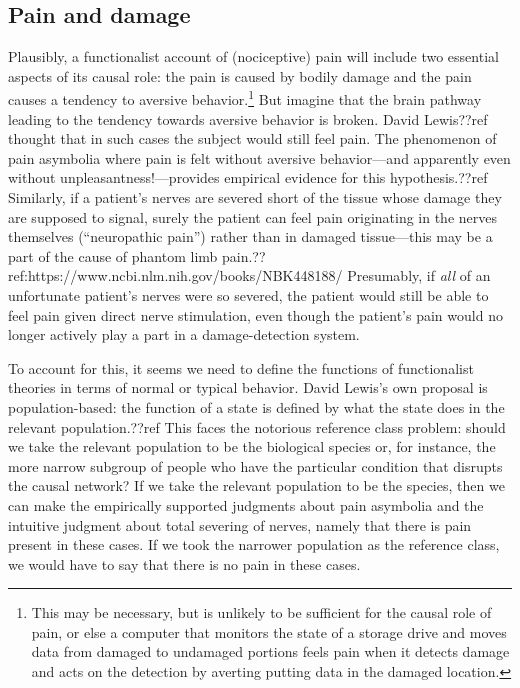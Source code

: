 \subsection{Pain and damage}
Plausibly, a functionalist account of (nociceptive) pain will include two essential aspects of its causal role: 
the pain is caused by bodily damage and the pain causes a tendency to aversive behavior.\footnote{This may be necessary, but is 
unlikely to be sufficient for the causal role of pain, or else a computer that monitors the state of a storage drive and 
moves data from damaged to undamaged portions feels pain when it detects damage and acts on the detection by averting 
putting data in the damaged location.} But imagine that the brain pathway leading to the tendency towards aversive behavior 
is broken. David Lewis??ref thought that in such cases the subject would still feel pain. The phenomenon of pain asymbolia
where pain is felt without aversive behavior---and apparently even without unpleasantness!---provides empirical evidence 
for this hypothesis.??ref Similarly, if a patient's nerves are severed short of the tissue whose damage they are 
supposed to signal, surely the patient can feel pain originating in the nerves themselves (``neuropathic pain'') rather 
than in damaged tissue---this may be a part of the cause of phantom limb pain.??ref:https://www.ncbi.nlm.nih.gov/books/NBK448188/ Presumably, if \textit{all} of an unfortunate
patient's nerves were so severed, the patient would still be able to feel pain given direct nerve stimulation,
even though the patient's pain would no longer actively play a part in a damage-detection system.

To account for this, it seems we need to define the functions of functionalist theories in terms of normal or typical 
behavior. David Lewis's own proposal is population-based: the function of a state is defined by what the state does in the 
relevant population.??ref This faces the notorious reference class problem: should we take the relevant population to be 
the biological species or, for instance, the more narrow subgroup of people who have the particular condition that disrupts the causal 
network? If we take the relevant population to be the species, then we can make the empirically supported judgments about 
pain asymbolia and the intuitive judgment about total severing of nerves, namely that there is pain present in these cases.
If we took the narrower population as the reference class, we would have to say that there is no pain in these cases. 

